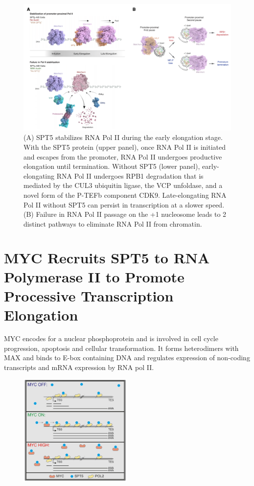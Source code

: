 \begin{figure}
\centering
\includegraphics[width=\textwidth]{../_resources/Screen_Shot_2022-12-19_at_17-00-41.png}
\caption{(A) SPT5 stabilizes RNA Pol II during the early elongation stage. With the SPT5 protein (upper panel), once RNA Pol II is initiated and escapes from the promoter, RNA Pol II undergoes productive elongation until termination. Without SPT5 (lower panel), early-elongating RNA Pol II undergoes RPB1 degradation that is mediated by the CUL3 ubiquitin ligase, the VCP unfoldase, and a novel form of the P-TEFb component CDK9. Late-elongating RNA Pol II without SPT5 can persist in transcription at a slower speed.
(B) Failure in RNA Pol II passage on the +1 nucleosome leads to 2 distinct pathways to eliminate RNA Pol II from chromatin.}
\end{figure}


\hypertarget{myc-recruits-spt5-to-rna-polymerase-ii-to-promote-processive-transcription-elongation}{%
\section{MYC Recruits SPT5 to RNA Polymerase II to Promote Processive Transcription Elongation}\label{myc-recruits-spt5-to-rna-polymerase-ii-to-promote-processive-transcription-elongation}}

MYC encodes for a nuclear phosphoprotein and is involved in cell cycle progression, apoptosis and cellular transformation. It forms heterodimers with MAX and binds to E-box containing DNA and regulates expression of non-coding transcripts and mRNA expression by RNA pol II.

\begin{figure}
\centering
\includegraphics[width=0.5\textwidth]{../_resources/Screenshot_2022-10-28_at_10-37-23.png}
\caption{}
\end{figure}

